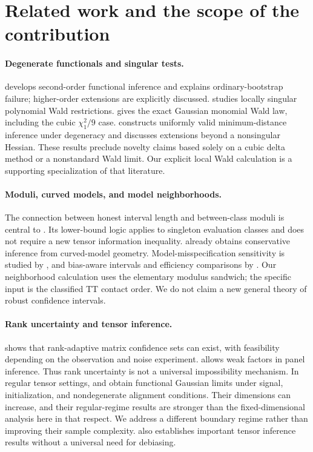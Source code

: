 \section{Related work and the scope of the contribution}
\paragraph{Degenerate functionals and singular tests.}
\citet{chenfang2019} develops second-order functional inference and explains ordinary-bootstrap failure; higher-order extensions are explicitly discussed. \citet{dufour2025} studies locally singular polynomial Wald restrictions. \citet{pillaimeng2016} gives the exact Gaussian monomial Wald law, including the cubic $\chi_1^2/9$ case. \citet{bei2026} constructs uniformly valid minimum-distance inference under degeneracy and discusses extensions beyond a nonsingular Hessian. These results preclude novelty claims based solely on a cubic delta method or a nonstandard Wald limit. Our explicit local Wald calculation is a supporting specialization of that literature.

\paragraph{Moduli, curved models, and model neighborhoods.}
The connection between honest interval length and between-class moduli is central to \citet{cailow2004}. Its lower-bound logic applies to singleton evaluation classes and does not require a new tensor information inequality. \citet{andrews2016} already obtains conservative inference from curved-model geometry. Model-misspecification sensitivity is studied by \citet{bonhomme2022}, and bias-aware intervals and efficiency comparisons by \citet{armstrong2021,armstrong2023}. Our neighborhood calculation uses the elementary modulus sandwich; the specific input is the classified TT contact order. We do not claim a new general theory of robust confidence intervals.

\paragraph{Rank uncertainty and tensor inference.}
\citet{carpentier2018} shows that rank-adaptive matrix confidence sets can exist, with feasibility depending on the observation and noise experiment. \citet{armstrong2026} allows weak factors in panel inference. Thus rank uncertainty is not a universal impossibility mechanism. In regular tensor settings, \citet{xu2025} and \citet{maxia2024} obtain functional Gaussian limits under signal, initialization, and nondegenerate alignment conditions. Their dimensions can increase, and their regular-regime results are stronger than the fixed-dimensional analysis here in that respect. We address a different boundary regime rather than improving their sample complexity. \citet{xia2022} also establishes important tensor inference results without a universal need for debiasing.

